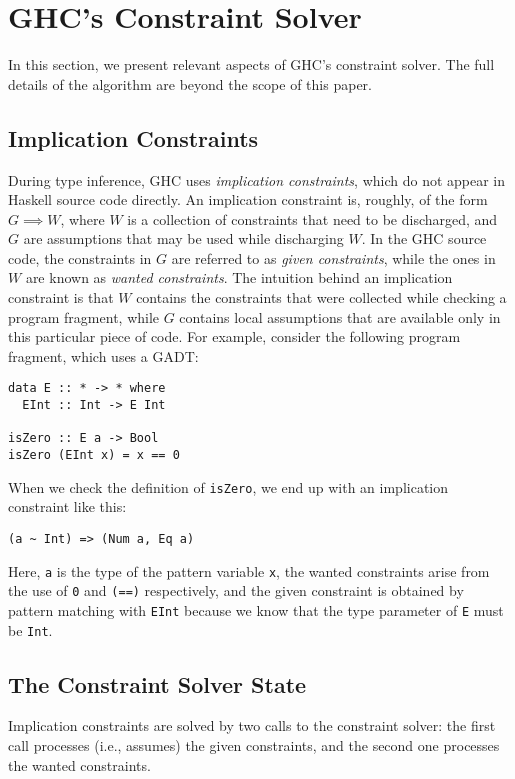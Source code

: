 \documentclass{sigplanconf}
\begin{document}
\section{GHC's Constraint Solver}
\label{GHC}

In this section, we present relevant aspects of GHC's constraint solver.
The full details of the algorithm \cite{outsidein} are beyond the scope
of this paper.

\subsection{Implication Constraints}
During type inference, GHC uses {\em implication constraints}, which do
not appear in Haskell source code directly. An implication constraint is,
roughly, of the form $G\implies W$, where $W$ is a collection
of constraints that need to be discharged, and $G$ are assumptions that
may be used while discharging $W$.  In the GHC source code, the constraints
in $G$ are referred to as {\em given constraints}, while the ones in $W$ are
known as {\em wanted constraints}.  The intuition behind an implication
constraint is that $W$ contains the constraints that were collected
while checking a program fragment, while $G$ contains local assumptions
that are available only in this particular piece of code.  For example,
consider the following program fragment, which uses a GADT:
\begin{Verbatim}
data E :: * -> * where
  EInt :: Int -> E Int

isZero :: E a -> Bool
isZero (EInt x) = x == 0
\end{Verbatim}
When we check the definition of \Verb"isZero", we end up with an implication
constraint like this:
\begin{Verbatim}
(a ~ Int) => (Num a, Eq a)
\end{Verbatim}
Here, \Verb"a" is the type of the pattern variable \Verb"x", the wanted
constraints arise from the use of \Verb"0" and \Verb"(==)" respectively,
and the given constraint is obtained by pattern matching with \Verb"EInt"
because we know that the type parameter of \Verb"E" must be \Verb"Int".


\subsection{The Constraint Solver State}
Implication constraints are solved by two calls to the constraint solver:
the first call processes (i.e., assumes) the given constraints, and the
second one processes the wanted constraints.
\end{document}
